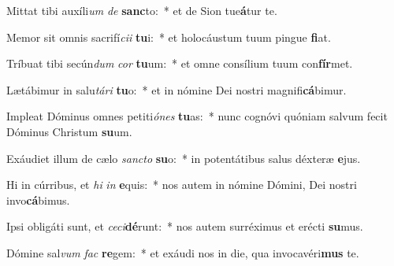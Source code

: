 \item Mittat tibi auxíli\textit{um} \textit{de} \textbf{sanc}to:~* et de Sion tue\textbf{á}tur te.
\item Memor sit omnis sacrifí\textit{ci}\textit{i} \textbf{tu}i:~* et holocáustum tuum pingue \textbf{fi}at.
\item Tríbuat tibi secún\textit{dum} \textit{cor} \textbf{tu}um:~* et omne consílium tuum con\textbf{fír}met.
\item Lætábimur in salu\textit{tá}\textit{ri} \textbf{tu}o:~* et in nómine Dei nostri magnifi\textbf{cá}bimur.
\item Impleat Dóminus omnes petiti\textit{ó}\textit{nes} \textbf{tu}as:~* nunc cognóvi quóniam salvum fecit Dóminus Christum \textbf{su}um.
\item Exáudiet illum de cælo \textit{sanc}\textit{to} \textbf{su}o:~* in potentátibus salus déxteræ \textbf{e}jus.
\item Hi in cúrribus, et \textit{hi} \textit{in} \textbf{e}quis:~* nos autem in nómine Dómini, Dei nostri invo\textbf{cá}bimus.
\item Ipsi obligáti sunt, et \textit{ce}\textit{ci}\textbf{dé}runt:~* nos autem surréximus et erécti \textbf{su}mus.
\item Dómine sal\textit{vum} \textit{fac} \textbf{re}gem:~* et exáudi nos in die, qua invocavéri\textbf{mus} te.
